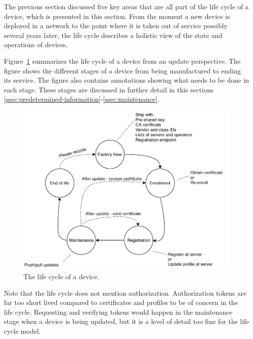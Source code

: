 \documentclass[0-thesis.tex]{subfiles}
\begin{document}
The previous section discussed five key areas that are all part of the life cycle of a
device, which is presented in this section. From the moment a new device is deployed in a
network to the point where it is taken out of service possibly several years later, the
life cycle describes a holistic view of the state and operations of devices.

Figure~\ref{fig:lifecycle} summarizes the life cycle of a device from an update
perspective. The figure shows the different stages of a device from being manufactured to
ending its service. The figure also contains annotations showing what needs to be done in
each stage. These stages are discussed in further detail in this sections
\ref{ssec:predetermined-information}-\ref{ssec:maintenance}. 

\begin{figure}
    \caption{The life cycle of a device.}
    \label{fig:lifecycle}
    \includegraphics{images/lifecycle.pdf}
\end{figure}

Note that the life cycle does not mention authorization. Authorization tokens are far too
short lived compared to certificates and profiles to be of concern in the life cycle.
Requesting and verifying tokens would happen in the maintenance stage when a device is
being updated, but it is a level of detail too fine for the life cycle model.
\end{document}
